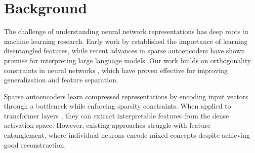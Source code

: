 \documentclass{article} %
\begin{document}





\section{Background}
\label{sec:background}

The challenge of understanding neural network representations has deep roots in machine learning research. Early work by \cite{Bengio2007LearningDA} established the importance of learning disentangled features, while recent advances in sparse autoencoders \cite{Cunningham2023SparseAF} have shown promise for interpreting large language models. Our work builds on orthogonality constraints in neural networks \cite{Li2019OrthogonalDN}, which have proven effective for improving generalization and feature separation.

Sparse autoencoders learn compressed representations by encoding input vectors through a bottleneck while enforcing sparsity constraints. When applied to transformer layers \cite{vaswani2017attention}, they can extract interpretable features from the dense activation space. However, existing approaches struggle with feature entanglement, where individual neurons encode mixed concepts despite achieving good reconstruction.
\end{document}
